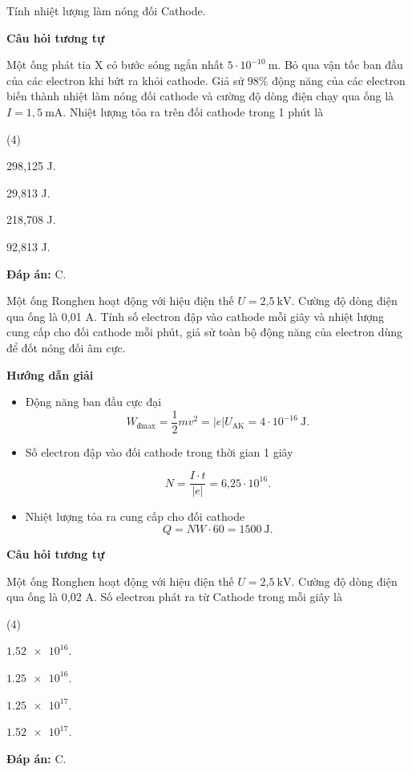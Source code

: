 \begin{dang}{Tính nhiệt lượng làm nóng đối Cathode.}
{		\begin{center}
			\textbf{Câu hỏi tương tự}
		\end{center}
		
		Một ống phát tia X có bước sóng ngắn nhất $5\cdot 10^{-10}\ \text{m}$. Bỏ qua vận tốc ban đầu của các electron khi bứt ra khỏi cathode. Giả sử $98\%$ động năng của các electron biến thành nhiệt làm nóng đối cathode và cường độ dòng điện chạy qua ống là $I = 1,5\ \text{mA}$. Nhiệt lượng tỏa ra trên đối cathode trong 1 phút là 
		\begin{mcq}(4)
			\item 298,125 J.
			\item 29,813 J.
			\item 218,708 J.
			\item 92,813 J.
		\end{mcq}
		
		\textbf{Đáp án:} C.
	}
	{Một ống Ronghen hoạt động với hiệu điện thế $U =\text{2,5}\ \text{kV}$. Cường độ dòng điện qua ống là 0,01 A. Tính số electron đập vào cathode mỗi giây và nhiệt lượng cung cấp cho đối cathode mỗi phút, giả sử toàn bộ động năng của electron dùng để đốt nóng đối âm cực.
	}
	{\begin{center}
			\textbf{Hướng dẫn giải}
		\end{center}   
		
		\begin{itemize}
			\item Động năng ban đầu cực đại
			\begin{equation*}
				W_{\text{đmax}}=\dfrac{1}{2}mv^2 =|e|U_{\text{AK}}= 4 \cdot 10^{-16}\ \text{J}.
			\end{equation*}
			\item Số electron đập vào đối cathode trong thời gian 1 giây
			
			\begin{equation*}
				N = \dfrac{I \cdot t}{|e|}= \text{6,25} \cdot 10^{16}.
			\end{equation*}
			\item Nhiệt lượng tỏa ra cung cấp cho đối cathode
			\begin{equation*}
				Q=NW \cdot 60 = 1500\ \text{J}.
			\end{equation*}
		\end{itemize}      
		\begin{center}
			\textbf{Câu hỏi tương tự}
		\end{center}
		
		Một ống Ronghen hoạt động với hiệu điện thế $U =\text{2,5}\ \text{kV}$. Cường độ dòng điện qua ống là 0,02 A. Số electron phát ra từ Cathode trong mỗi giây là
		\begin{mcq}(4)
			\item $ \num{1,52 e16} $.
			\item $ \num{1,25 e16} $.
			\item $ \num{1,25 e17} $.
			\item $ \num{1,52 e17} $.
		\end{mcq}
		
		\textbf{Đáp án:} C.
	}
	
\end{dang}
